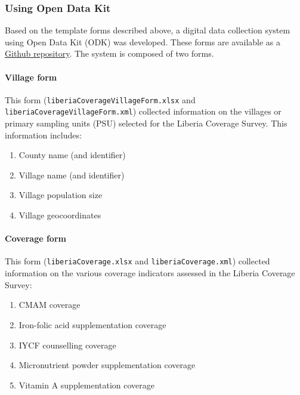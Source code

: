 \documentclass[12pt,a4paper]{article}
\let\oldparagraph\paragraph
\renewcommand{\paragraph}[1]{\oldparagraph{#1}\mbox{}}
\theoremstyle{definition}
\theoremstyle{definition}
\theoremstyle{definition}
\theoremstyle{remark}
\begin{document}
\hypertarget{using-open-data-kit}{%
\subsubsection{Using Open Data Kit}\label{using-open-data-kit}}

Based on the template forms described above, a digital data collection
system using Open Data Kit (ODK) was developed. These forms are
available as a
\href{https://github.com/validmeasures/liberiaS3Mforms}{Github
repository}. The system is composed of two forms.

\hypertarget{village-form}{%
\paragraph{Village form}\label{village-form}}

This form (\texttt{liberiaCoverageVillageForm.xlsx} and
\texttt{liberiaCoverageVillageForm.xml}) collected information on the
villages or primary sampling units (PSU) selected for the Liberia
Coverage Survey. This information includes:

\begin{enumerate}
\def\labelenumi{\arabic{enumi}.}
\item
  County name (and identifier)
\item
  Village name (and identifier)
\item
  Village population size
\item
  Village geocoordinates
\end{enumerate}

\hypertarget{coverage-form}{%
\paragraph{Coverage form}\label{coverage-form}}

This form (\texttt{liberiaCoverage.xlsx} and
\texttt{liberiaCoverage.xml}) collected information on the various
coverage indicators assessed in the Liberia Coverage Survey:

\begin{enumerate}
\def\labelenumi{\arabic{enumi}.}
\item
  CMAM coverage
\item
  Iron-folic acid supplementation coverage
\item
  IYCF counselling coverage
\item
  Micronutrient powder supplementation coverage
\item
  Vitamin A supplementation coverage
\end{enumerate}
\end{document}
